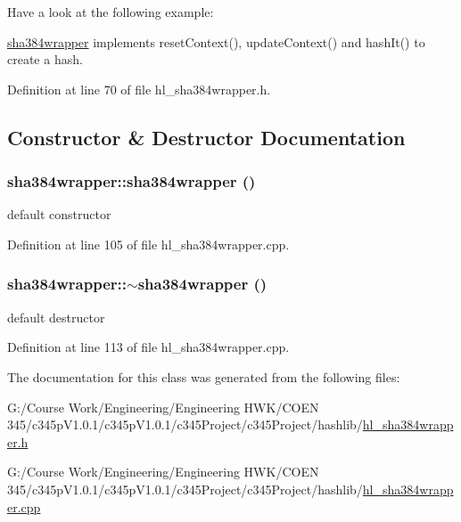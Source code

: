 Have a look at the following example:


\begin{DoxyCodeInclude}
\end{DoxyCodeInclude}


\hyperlink{classsha384wrapper}{sha384wrapper} implements resetContext(), updateContext() and hashIt() to create a hash. 

Definition at line 70 of file hl\_\-sha384wrapper.h.

\subsection{Constructor \& Destructor Documentation}
\hypertarget{classsha384wrapper_aa0e4f55fb4be6e3b8dea70a4cc4bcd8e}{
\subsubsection[{sha384wrapper}]{\setlength{\rightskip}{0pt plus 5cm}sha384wrapper::sha384wrapper ()}}
\label{classsha384wrapper_aa0e4f55fb4be6e3b8dea70a4cc4bcd8e}


default constructor 

Definition at line 105 of file hl\_\-sha384wrapper.cpp.\hypertarget{classsha384wrapper_a6e77b7bef7fbfb01d6c33c96d46ebf24}{
\subsubsection[{$\sim$sha384wrapper}]{\setlength{\rightskip}{0pt plus 5cm}sha384wrapper::$\sim$sha384wrapper ()}}
\label{classsha384wrapper_a6e77b7bef7fbfb01d6c33c96d46ebf24}


default destructor 

Definition at line 113 of file hl\_\-sha384wrapper.cpp.

The documentation for this class was generated from the following files:\begin{DoxyCompactItemize}
\item 
G:/Course Work/Engineering/Engineering HWK/COEN 345/c345pV1.0.1/c345pV1.0.1/c345Project/c345Project/hashlib/\hyperlink{hl__sha384wrapper_8h}{hl\_\-sha384wrapper.h}\item 
G:/Course Work/Engineering/Engineering HWK/COEN 345/c345pV1.0.1/c345pV1.0.1/c345Project/c345Project/hashlib/\hyperlink{hl__sha384wrapper_8cpp}{hl\_\-sha384wrapper.cpp}\end{DoxyCompactItemize}
